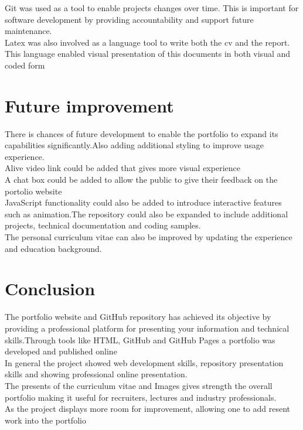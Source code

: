 \documentclass[10pt, titlepage, oneside, a4paper]{article}
\begin{document}
Git was used as a tool to enable projects changes over time. This is important for software development by providing accountability and support future maintenance. \\

Latex was also involved as a language tool to write both the cv and the report. This language enabled visual presentation of this documents in both visual and coded form \\
 

\section{Future improvement}

There is chances of future development to enable the portfolio to expand its capabilities significantly.Also adding additional styling to improve usage experience. \\
Alive video link could be added that gives more visual experience \\ 
A chat box could be added to allow the public to give their feedback on the portolio website 
\\
JavaScript functionality could also be added to introduce interactive features such as animation.The repository could also be expanded to include additional projects, technical documentation and coding samples. \\
The personal curriculum vitae can also be improved by updating the experience and education background.

\section{Conclusion}

The portfolio website and GitHub repository has achieved its objective by providing a professional platform for presenting your information and technical skills.Through tools like HTML, GitHub and GitHub Pages a portfolio was developed and published online \\

In general the project showed web development skills, repository presentation skills and showing professional online presentation. \\
The presents of the curriculum vitae and Images gives strength the overall portfolio making it useful for recruiters, lectures and industry professionals. \\ 
As the project displays more room for improvement, allowing one to add resent work into the portfolio
\end{document}
